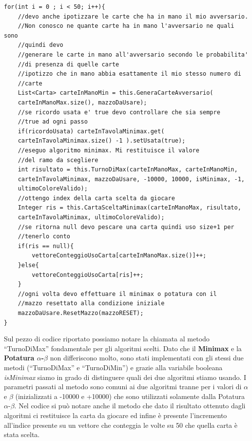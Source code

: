 \begin{lstlisting}
for(int i = 0 ; i < 50; i++){
    //devo anche ipotizzare le carte che ha in mano il mio avversario. 
    //Non conosco ne quante carte ha in mano l'avversario ne quali sono
    //quindi devo
    //generare le carte in mano all'avversario secondo le probabilita'
    //di presenza di quelle carte
    //ipotizzo che in mano abbia esattamente il mio stesso numero di
    //carte
    List<Carta> carteInManoMin = this.GeneraCarteAvversario(
    carteInManoMax.size(), mazzoDaUsare); 
    //se ricordo usata e' true devo controllare che sia sempre 
    //true ad ogni passo
    if(ricordoUsata) carteInTavolaMinimax.get(
    carteInTavolaMinimax.size() -1 ).setUsata(true);
    //eseguo algoritmo minimax. Mi restituisce il valore
    //del ramo da scegliere
    int risultato = this.TurnoDiMax(carteInManoMax, carteInManoMin,
    carteInTavolaMinimax, mazzoDaUsare, -10000, 10000, isMinimax, -1,
    ultimoColoreValido);
    //ottengo index della carta scelta da giocare
    Integer ris = this.CartaSceltaMinimax(carteInManoMax, risultato,
    carteInTavolaMinimax, ultimoColoreValido);
    //se ritorna null devo pescare una carta quindi uso size+1 per
    //tenerlo conto
    if(ris == null){
        vettoreConteggioUsoCarta[carteInManoMax.size()]++;
    }else{
        vettoreConteggioUsoCarta[ris]++;
    }
    //ogni volta devo effettuare il minimax o potatura con il
    //mazzo resettato alla condizione iniziale
    mazzoDaUsare.ResetMazzo(mazzoRESET);
}
\end{lstlisting}
		
		Sul pezzo di codice riportato possiamo notare la chiamata al metodo ``TurnoDiMax'' fondamentale per gli algoritmi scelti. Dato che il \textbf{Minimax} e la \textbf{Potatura $\alpha$-$\beta$} non differiscono molto, sono stati implementati con gli stessi due metodi (``TurnoDiMax'' e ``TurnoDiMin'') e grazie alla variabile booleana \textit{isMinimax} siamo in grado di distinguere quali dei due algoritmi stiamo usando. I parametri passati al metodo sono comuni ai due algoritmi tranne per i valori di $\alpha$ e $\beta$ (inizializzati a -10000 e +10000) che sono utilizzati solamente dalla Potatura $\alpha$-$\beta$. Nel codice si può notare anche il metodo che dato il risultato ottenuto dagli algoritmi ci restituisce la carta da giocare ed infine è presente l'incremento all'indice presente su un vettore che conteggia le volte su 50 che quella carta è stata scelta.
		
